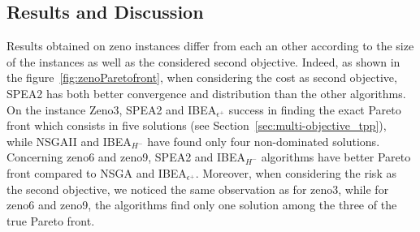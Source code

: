 \documentclass{llncs}
\begin{document}
\subsection{Results and Discussion}
Results obtained on zeno instances  differ from each an other according to  the  size of the instances as well as the  considered second objective.
Indeed, as shown in the figure~\ref{fig:zenoParetofront}, when  considering  the cost as second objective, 
SPEA2 has  both better convergence and distribution than the other algorithms.
On  the instance  Zeno3, SPEA2 and IBEA$_{\epsilon^+}$ success in finding the  exact Pareto front  which consists in five solutions (see Section~\ref{sec:multi-objective_tpp}), while NSGAII and IBEA$_{H^-}$  have found only four non-dominated solutions.
Concerning  zeno6 and  zeno9,  SPEA2 and IBEA$_{H^-}$  algorithms have better Pareto front compared to NSGA and IBEA$_{\epsilon^+}$.
Moreover, when considering the risk as the second objective, we noticed the same observation as for zeno3, while for zeno6  and zeno9, the algorithms find only one solution among the three of the true Pareto front.%


\end{document}
